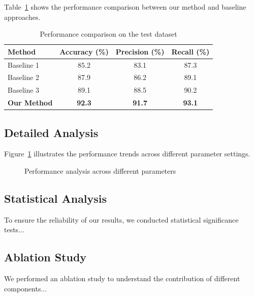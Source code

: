 Table~\ref{tab:results} shows the performance comparison between our method and baseline approaches.

\begin{table}[ht]
\centering
\caption{Performance comparison on the test dataset}
\label{tab:results}
\begin{tabular}{lccc}
\hline
Method & Accuracy (\%) & Precision (\%) & Recall (\%) \\
\hline
Baseline 1 & 85.2 & 83.1 & 87.3 \\
Baseline 2 & 87.9 & 86.2 & 89.1 \\
Baseline 3 & 89.1 & 88.5 & 90.2 \\
\textbf{Our Method} & \textbf{92.3} & \textbf{91.7} & \textbf{93.1} \\
\hline
\end{tabular}
\end{table}

\subsection{Detailed Analysis}

Figure~\ref{fig:performance} illustrates the performance trends across different parameter settings.

\begin{figure}[ht]
\centering
\caption{Performance analysis across different parameters}
\label{fig:performance}
\end{figure}

\subsection{Statistical Analysis}

To ensure the reliability of our results, we conducted statistical significance tests...

\subsection{Ablation Study}

We performed an ablation study to understand the contribution of different components...